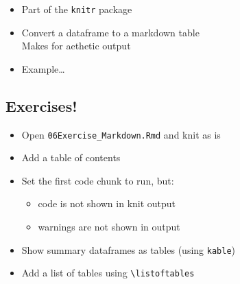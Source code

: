 \documentclass[
]{article}
\providecommand{\tightlist}{%
  \setlength{\itemsep}{0pt}\setlength{\parskip}{0pt}}
\begin{document}
\begin{itemize}
\tightlist
\item
  Part of the \texttt{knitr} package
\item
  Convert a dataframe to a markdown table\\
  Makes for aethetic output
\item
  Example\ldots{}
\end{itemize}

\subsection{Exercises!}\label{exercises}

\begin{itemize}
\tightlist
\item
  Open \texttt{06Exercise\_Markdown.Rmd} and knit as is
\item
  Add a table of contents
\item
  Set the first code chunk to run, but:

  \begin{itemize}
  \tightlist
  \item
    code is not shown in knit output
  \item
    warnings are not shown in output
  \end{itemize}
\item
  Show summary dataframes as tables (using \texttt{kable})
\item
  Add a list of tables using \texttt{\textbackslash{}listoftables}
\end{itemize}
\end{document}
